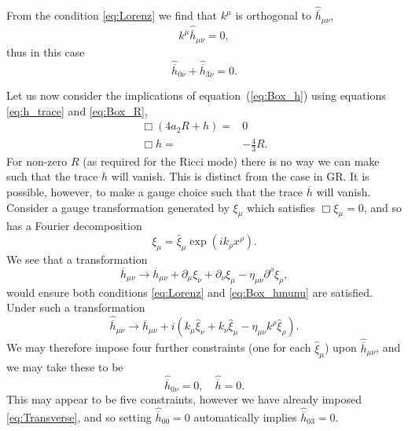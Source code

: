 \documentclass[a4paper, 11pt, titlepage, twoside]{report}
\newcommand{\eqnref}[1]{equation~(\ref{eq:#1})}
\begin{document}
From the condition \eqref{eq:Lorenz} we find that $k^\mu$ is orthogonal to $\hat{\overline{h}}_{\mu\nu}$,
\begin{equation}
k^\mu\hat{\overline{h}}_{\mu\nu} = 0,
\end{equation}
thus in this case
\begin{equation}
\hat{\overline{h}}_{0\nu} + \hat{\overline{h}}_{3\nu} = 0.
\label{eq:Transverse}
\end{equation}

Let us now consider the implications of \eqnref{Box_h} using equations \eqref{eq:h_trace} and \eqref{eq:Box_R},
\begin{align}
\Box\left(4a_2R + h\right) = {} & 0 \nonumber \\
\Box h = {} & -\frac{4}{3}R.
\end{align}
For non-zero $R$ (as required for the Ricci mode) there is no way we can make such that the trace $h$ will vanish. This is distinct from the case in GR. It is possible, however, to make a gauge choice such that the trace $\overline{h}$ will vanish. Consider a gauge transformation generated by $\xi_\mu$ which satisfies $\Box \xi_\mu = 0$, and so has a Fourier decomposition
\begin{equation}
\xi_\mu = \hat{\xi}_\mu \exp\left(ik_\rho x^\rho\right).
\end{equation}
We see that a transformation
\begin{equation}
\overline{h}_{\mu\nu} \rightarrow \overline{h}_{\mu\nu} + \partial_\mu\xi_\nu + \partial_\nu\xi_\mu - \eta_{\mu\nu}\partial^\rho\xi_\rho,
\end{equation}
would ensure both conditions \eqref{eq:Lorenz} and \eqref{eq:Box_hmunu} are satisfied. Under such a transformation
\begin{equation}
\hat{\overline{h}}_{\mu\nu} \rightarrow \hat{\overline{h}}_{\mu\nu} + i\left(k_\mu\hat{\xi}_\nu + k_\nu\hat{\xi}_\mu - \eta_{\mu\nu}k^\rho\hat{\xi}_\rho\right).
\end{equation}
We may therefore impose four further constraints (one for each $\hat{\xi}_\mu$) upon $\hat{\overline{h}}_{\mu\nu}$, and we may take these to be
\begin{equation}
\hat{\overline{h}}_{0\nu} = 0, \quad \hat{\overline{h}} = 0.
\end{equation}
This may appear to be five constraints, however we have already imposed \eqref{eq:Transverse}, and so setting $\hat{\overline{h}}_{00} = 0$ automatically implies $\hat{\overline{h}}_{03} = 0$.
\end{document}
